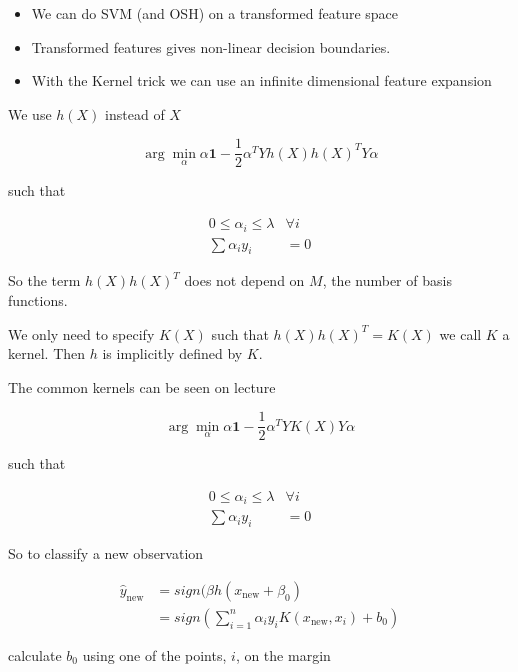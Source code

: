 \begin{itemize}
  \item We can do SVM (and OSH) on a transformed feature space
  \item Transformed features gives non-linear decision boundaries.
  \item With the Kernel trick we can use an infinite dimensional feature expansion
\end{itemize}

We use $h(X)$ instead of $X$

\[
    \arg \min\limits_{\alpha} \alpha \bm{1} - \frac{1}{2} \alpha^T Y h(X)h(X)^T Y \alpha
\]

such that

\begin{equation}
    \begin{split}
       0 \leq \alpha_i \leq \lambda & \forall i \\
       \sum \alpha_i y_i & = 0
    \end{split}
\end{equation}

So the term $h(X)h(X)^T$ does not depend on $M$, the number of basis functions.

We only need to specify $K(X)$ such that $h(X)h(X)^T = K(X)$ we call $K$ a kernel. Then $h$ is implicitly defined by $K$. 

The common kernels can be seen on lecture \cite[p.~38]{lecture5}

\[
    \arg \min\limits_{\alpha} \alpha \bm{1} - \frac{1}{2} \alpha^T Y K(X)Y \alpha
\]

such that

\begin{equation}
    \begin{split}
       0 \leq \alpha_i \leq \lambda & \forall i \\
       \sum \alpha_i y_i & = 0
    \end{split}
\end{equation}

So to classify a new observation

\[
    \begin{split}
       \hat{y}_\text{new}  & = sign(\beta h(x_\text{new} + \beta_0) \\
         & = sign \left( \sum_{i=1}^{n} \alpha_i y_i K(x_\text{new}, x_i) + b_0 \right)
    \end{split}
\]

calculate $b_0$ using one of the points, $i$, on the margin

